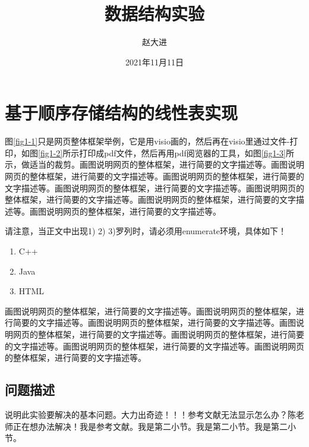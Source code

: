 \documentclass[supercite]{Experimental_Report}
\title{~~~~~~数据结构实验~~~~~~}
\author{赵大进}
\date{2021年11月11日}
\theoremstyle{definition}
\begin{document}
\maketitle

\clearpage


\tableofcontents[level=2]

\clearpage


\section{基于顺序存储结构的线性表实现}

图\ref{fig1-1}只是网页整体框架举例，它是用visio画的，然后再在visio里通过文件-打印，如图\ref{fig1-2}所示打印成pdf文件，然后再用pdf阅览器的工具，如图\ref{fig1-3}所示，做适当的裁剪。画图说明网页的整体框架，进行简要的文字描述等。画图说明网页的整体框架，进行简要的文字描述等。画图说明网页的整体框架，进行简要的文字描述等。画图说明网页的整体框架，进行简要的文字描述等。画图说明网页的整体框架，进行简要的文字描述等。画图说明网页的整体框架，进行简要的文字描述等。画图说明网页的整体框架，进行简要的文字描述等。

请注意，当正文中出现1) 2) 3)罗列时，请必须用enumerate环境，具体如下！

\begin{enumerate}
\renewcommand{\labelenumi}{\theenumi)}
	\item C++
	\item Java
	\item HTML
\end{enumerate}

画图说明网页的整体框架，进行简要的文字描述等。画图说明网页的整体框架，进行简要的文字描述等。画图说明网页的整体框架，进行简要的文字描述等。画图说明网页的整体框架，进行简要的文字描述等。画图说明网页的整体框架，进行简要的文字描述等。画图说明网页的整体框架，进行简要的文字描述等。画图说明网页的整体框架，进行简要的文字描述等。

\subsection{问题描述}

说明此实验要解决的基本问题。大力出奇迹！！！参考文献无法显示怎么办？陈老师正在想办法解决\cite{STR2021Neurocom, AVS2021Neurocom}！我是参考文献。我是第二小节\cite{Mehrabian1974An}。我是第二小节\cite{Rezaei2014CVPR}。我是第二小节\cite{Ramnath2008IJCV}。
\end{document}
